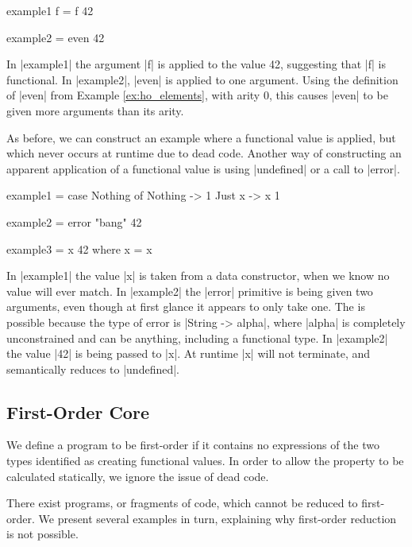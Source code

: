 \documentclass[preprint]{sigplanconf}
\begin{document}
\begin{example}
\begin{code}
example1 f = f 42

example2 = even 42
\end{code}

In |example1| the argument |f| is applied to the value 42, suggesting that |f| is functional. In |example2|, |even| is applied to one argument. Using the definition of |even| from Example \ref{ex:ho_elements}, with arity 0, this causes |even| to be given more arguments than its arity.
\end{example}

As before, we can construct an example where a functional value is applied, but which never occurs at runtime due to dead code. Another way of constructing an apparent application of a functional value is using |undefined| or a call to |error|.

\begin{example}
\begin{code}
example1 = case  Nothing of
                 Nothing  ->  1
                 Just x   ->  x 1

example2 = error "bang" 42

example3 = x 42
    where x = x
\end{code}

In |example1| the value |x| is taken from a data constructor, when we know no value will ever match. In |example2| the |error| primitive is being given two arguments, even though at first glance it appears to only take one. The is possible because the type of error is |String -> alpha|, where |alpha| is completely unconstrained and can be anything, including a functional type. In |example2| the value |42| is being passed to |x|. At runtime |x| will not terminate, and semantically reduces to |undefined|.
\end{example}

\subsection{First-Order Core}
\label{sec:first_order_restrictions}

We define a program to be first-order if it contains no expressions of the two types identified as creating functional values. In order to allow the property to be calculated statically, we ignore the issue of dead code.

There exist programs, or fragments of code, which cannot be reduced to first-order. We present several examples in turn, explaining why first-order reduction is not possible.
\end{document}
